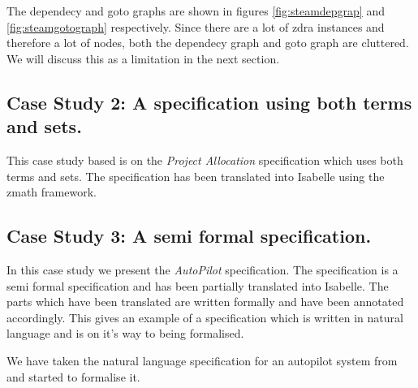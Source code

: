 The dependecy and goto graphs are shown in figures \ref{fig:steamdepgrap} and \ref{fig:steamgotograph} respectively. Since there are a lot of \gls{zdra} instances and therefore a lot of nodes, both the dependecy graph and goto graph are cluttered. We will discuss this as a limitation in the next section.

\subsection{Case Study 2: A specification using both terms and sets.}

This case study based is on the \emph{Project Allocation} specification which uses both terms and sets. The specification has been translated into Isabelle using the \gls{zmath} framework.

\subsection{Case Study 3: A semi formal specification.}

In this case study we present the \emph{AutoPilot} specification. The specification is a semi formal specification and has been partially translated into Isabelle. The parts which have been translated are written formally and have been annotated accordingly. This gives an example of a specification which is written in natural language and is on it's way to being formalised.

We have taken the natural language specification for an autopilot system from \cite{Butler96} and started to formalise it.

